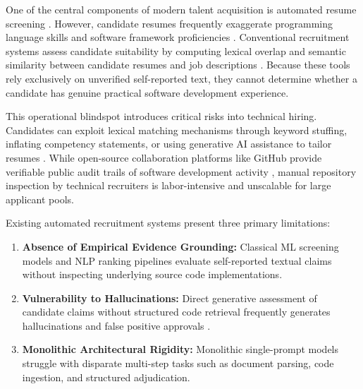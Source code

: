 \documentclass[conference]{IEEEtran}
\begin{document}
One of the central components of modern talent acquisition is automated resume screening \cite{sinha2021resumescreening, alamri2022nlp}. However, candidate resumes frequently exaggerate programming language skills and software framework proficiencies \cite{deshpande2023candidate}. Conventional recruitment systems assess candidate suitability by computing lexical overlap and semantic similarity between candidate resumes and job descriptions \cite{lo2025aihiring}. Because these tools rely exclusively on unverified self-reported text, they cannot determine whether a candidate has genuine practical software development experience.

This operational blindspot introduces critical risks into technical hiring. Candidates can exploit lexical matching mechanisms through keyword stuffing, inflating competency statements, or using generative AI assistance to tailor resumes \cite{brown2020gpt3}. While open-source collaboration platforms like GitHub provide verifiable public audit trails of software development activity \cite{kalliamvakou2014github, vasilescu2015developer}, manual repository inspection by technical recruiters is labor-intensive and unscalable for large applicant pools.

Existing automated recruitment systems present three primary limitations:
\begin{enumerate}
    \item \textbf{Absence of Empirical Evidence Grounding:} Classical ML screening models \cite{sinha2021resumescreening} and NLP ranking pipelines \cite{alamri2022nlp} evaluate self-reported textual claims without inspecting underlying source code implementations.
    \item \textbf{Vulnerability to Hallucinations:} Direct generative assessment of candidate claims without structured code retrieval frequently generates hallucinations and false positive approvals \cite{lewis2020rag}.
    \item \textbf{Monolithic Architectural Rigidity:} Monolithic single-prompt models struggle with disparate multi-step tasks such as document parsing, code ingestion, and structured adjudication.
\end{enumerate}
\end{document}
